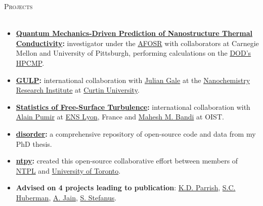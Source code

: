 \documentclass{article}
\newcommand{\lineunder}{\vspace*{-8pt} \\ \hspace*{-18pt} \hrulefill \\}
\newcommand{\header}[1]{{\hspace*{-15pt}\vspace*{6pt} \textsc{#1}} \vspace*{-6pt} \lineunder}
\newenvironment{achievements}{\begin{list}{$\bullet$}{\topsep 0pt \itemsep -2pt}}{\vspace*{4pt}\end{list}}
\begin{document}
\header{Projects}
\begin{itemize}[leftmargin=*]

\item \textbf{\href{http://ntpl.me.cmu.edu/research.html}{Quantum Mechanics-Driven Prediction of Nanostructure Thermal Conductivity}:} investigator under the 
\href{http://www.wpafb.af.mil/afrl/afosr/}{AFOSR} with collaborators at Carnegie Mellon and University of Pittsburgh, performing 
calculations on the \href{http://www.hpcmo.hpc.mil/cms2/index.php}{DOD's HPCMP}.

\item \textbf{\href{https://nanochemistry.curtin.edu.au/local/docs/gulp/gulp4.2_manual.pdf}{GULP}:} international collaboration with \href{http://nanochemistry.curtin.edu.au/people/staff.cfm/J.Gale}{Julian Gale} at the 
\href{http://nanochemistry.curtin.edu.au/}{Nanochemistry Research Institute} at \href{http://www.curtin.edu.au/}{Curtin University}.

\item \textbf{\href{http://jasonlarkin.github.io/projects-ms.html}{Statistics of Free-Surface Turbulence}:} international collaboration with \href{http://perso.ens-lyon.fr/alain.pumir/Pumir_webpage.html}{Alain Pumir} at \href{http://www.ens-lyon.eu/annuaire/m-pumir-alain-83656.kjsp?RH=ZYZYZYZYZYZYZYZYZYZYZY}{ENS Lyon}, France and \href{https://groups.oist.jp/ciu/mahesh-m-bandi}{Mahesh M. Bandi} at OIST.  

  \item \textbf{\href{https://github.com/jasonlarkin/disorder}{disorder}:} a comprehensive repository of open-source code and data from my PhD thesis.

  \item \textbf{\href{https://github.com/ntpl/ntpy}{ntpy}:} created this open-source  collaborative effort between members of \href{http://ntpl.me.cmu.edu/}{NTPL} and \href{http://www.mie.utoronto.ca/labs/atoms/}{University of Toronto}.

  \item \textbf{Advised on 4 projects leading to publication}: \href{http://ntpl.me.cmu.edu/publications.html}{K.D. Parrish}, \href{https://tspace.library.utoronto.ca/bitstream/1807/42871/1/Huberman_Samuel_C_201311_MASc_thesis.pdf}{S.C. Huberman}, \href{http://blogs.ubc.ca/amerimech2014/files/2014/04/ameritech_mcgaughey_apr14.pdf}{A. Jain}, \href{http://jasonlarkin.github.io/pub.html}{S. Stefanus}.


\end{itemize}
\end{document}
